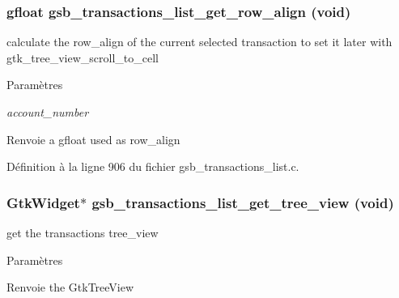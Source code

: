 \subsubsection[{gsb\_\-transactions\_\-list\_\-get\_\-row\_\-align}]{\setlength{\rightskip}{0pt plus 5cm}gfloat gsb\_\-transactions\_\-list\_\-get\_\-row\_\-align (void)}\label{gsb__transactions__list_8c_aaae69a76295b86b7baace98ce4066738}
calculate the row\_\-align of the current selected transaction to set it later with gtk\_\-tree\_\-view\_\-scroll\_\-to\_\-cell


\begin{DoxyParams}{Paramètres}
\item[{\em account\_\-number}]\end{DoxyParams}
\begin{DoxyReturn}{Renvoie}
a gfloat used as row\_\-align 
\end{DoxyReturn}


Définition à la ligne 906 du fichier gsb\_\-transactions\_\-list.c.

\subsubsection[{gsb\_\-transactions\_\-list\_\-get\_\-tree\_\-view}]{\setlength{\rightskip}{0pt plus 5cm}GtkWidget$\ast$ gsb\_\-transactions\_\-list\_\-get\_\-tree\_\-view (void)}\label{gsb__transactions__list_8c_a9c93505713234d8fa4727b067a140641}
get the transactions tree\_\-view


\begin{DoxyParams}{Paramètres}
\item[{\em }]\end{DoxyParams}
\begin{DoxyReturn}{Renvoie}
the GtkTreeView 
\end{DoxyReturn}


